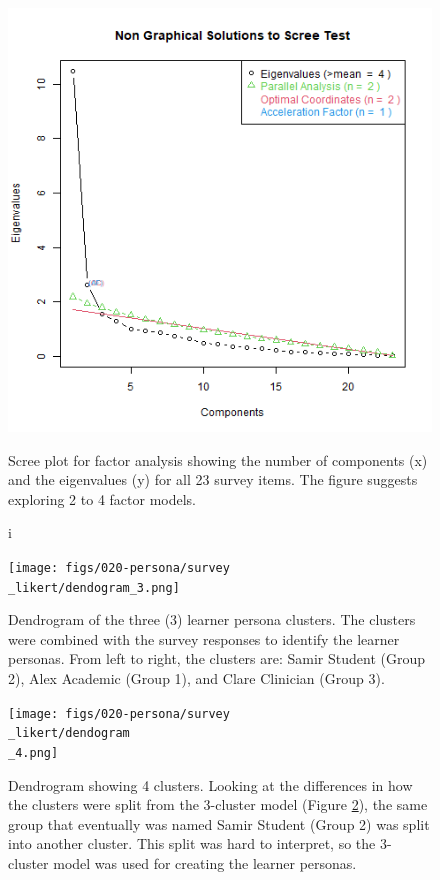 \documentclass[020-persona\_validation.tex]{subfiles}
\begin{document}
    \begin{figure}[!htbp]
        \centering
        \includegraphics[scale=0.5]{figs/010-validation/efa_eigen_scree.png}
        \caption[Scree plot for factor analysis]i
        {Scree plot for factor analysis showing the number of components (x) and the eigenvalues (y) for all 23 survey items.
            The figure suggests exploring 2 to 4 factor models.
        }
        \label{fig:scree-fa-all}
    \end{figure}

    \begin{figure}[!htbp]
        \centering
        \texttt{[image: figs/020-persona/survey\\\_likert/dendogram\_3.png]}
        \caption[Dendrogram of the 3 learner persona clusters]
        {Dendrogram of the three (3) learner persona clusters.
        The clusters were combined with the survey responses to identify the learner personas.
        From left to right, the clusters are: Samir Student (Group 2), Alex Academic (Group 1),
        and Clare Clinician (Group 3).
        }
        \label{sfig:dendro-cluster-3}
    \end{figure}

    \begin{figure}[!htbp]
        \centering
        \texttt{[image: figs/020-persona/survey\\\_likert/dendogram\\\_4.png]}
        \caption[4 cluster dendrogram.]
        {Dendrogram showing 4 clusters. Looking at the differences in how the clusters were split from the 3-cluster model
        (Figure \ref{sfig:dendro-cluster-3}),
        the same group that eventually was named Samir Student (Group 2) was split into another cluster.
        This split was hard to interpret, so the 3-cluster model was used for creating the learner personas.
        }
        \label{sfig:dendro-4}
    \end{figure}
\end{document}
